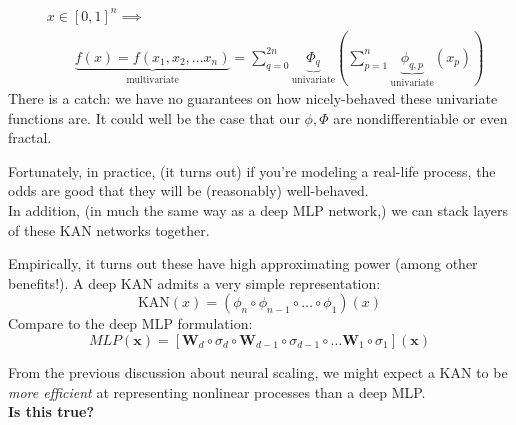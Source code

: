\begin{frame}
    \begin{align*}
        & x \in [0, 1]^n \implies \\
        & \qquad \underbrace{f(x) = f(x_1, x_2, \ldots x_n)}_{\text{multivariate}}
        = \sum_{q=0}^{2n} \underbrace{\Phi_q}_{\text{univariate}} \left(
            \sum_{p=1}^n \underbrace{\phi_{q, p}}_{\text{univariate}} (x_p)
            \right)
    \end{align*}
    There is a catch: we have no guarantees on how nicely-behaved these univariate functions are.
    It could well be the case that our $\phi, \Phi$ are nondifferentiable or even fractal.
\end{frame}

\begin{frame}
    Fortunately, in practice, (it turns out) if you're modeling a real-life process, the odds are good that they will be 
    (reasonably) well-behaved. \\
    \vspace{5mm}
    In addition, (in much the same way as a deep MLP network,) we can stack layers of these KAN networks together.
\end{frame}

\begin{frame}
    Empirically, it turns out these have high approximating power (among other benefits!).
    A deep KAN admits a very simple representation:
    \[
        \text{KAN}(x) = (\phi_n \circ \phi_{n-1} \circ \ldots \circ \phi_1)(x)
    \]
    Compare to the deep MLP formulation:
    \[
        MLP(\mathbf{x}) = \left[
            \mathbf{W}_d \circ \sigma_d \circ
            \mathbf{W}_{d-1} \circ \sigma_{d-1} \circ
                \ldots
            \mathbf{W}_{1} \circ \sigma_{1} 
        \right] (\mathbf{x} )
    \]
\end{frame}

\begin{frame}
    From the previous discussion about neural scaling, we might expect a KAN to
    be \textit{more efficient} at representing nonlinear processes than a deep MLP.
    \\ \vspace{5mm}
    \textbf{Is this true?}
\end{frame}

\begin{frame}
\end{frame}


